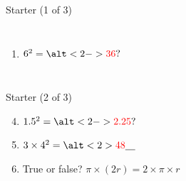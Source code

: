 \documentclass{beamer}
\newcommand{\ablank}[1]{%
  \alt<2>{\textcolor{red}{#1}}{\underline{\phantom{#1}}}%
}
\newcommand{\ashow}[1]{\uncover<2->{\textcolor{red}{\small #1}}}
\newcommand{\ashowq}[1]{\alt<2->{\textcolor{red}{\small #1}}{?}}
\begin{document}
\begin{frame}{Starter (1 of 3)}

\begin{columns}


\small
\begin{enumerate}
  \item $6^2 = \ashowq{36}$
\end{enumerate}

\end{columns}
\end{frame}

\begin{frame}{Starter (2 of 3)}

\vspace{-2em}
\begin{enumerate}
  \setcounter{enumi}{3}
  \item $1.5^2 = \ashowq{2.25}$
  \item $3 \times 4^2=\ablank{48}$
  \item True or false? $\pi \times (2r) = 2 \times \pi \times r$ \ashow{True}
\end{enumerate}

\end{frame}
\end{document}
